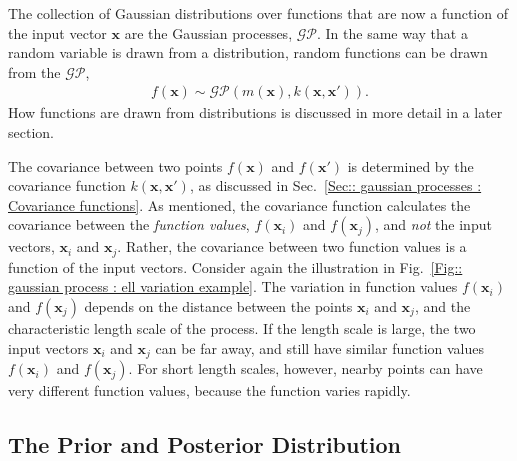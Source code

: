\documentclass[twoside,english]{uiofysmaster}
\begin{document}
{The collection of Gaussian distributions over functions that are now a function of the input vector $\textbf{x}$ are the Gaussian processes, $\mathcal{GP}$. In the same way that a random variable is drawn from a distribution, random functions can be drawn from the $\mathcal{GP}$,
\begin{align}
f(\textbf{x}) \sim \mathcal{GP}(m(\textbf{x}), k(\textbf{x}, \textbf{x}')).
\end{align}
How functions are drawn from distributions is discussed in more detail in a later section.

The covariance between two points $f(\textbf{x})$ and $f(\textbf{x}')$ is determined by the covariance function $k(\textbf{x}, \textbf{x}')$, as discussed in Sec.~\ref{Sec:: gaussian processes : Covariance functions}. As mentioned, the covariance function calculates the covariance between the \textit{function values}, $f(\textbf{x}_i)$ and $f(\textbf{x}_j)$, and \textit{not} the input vectors, $\textbf{x}_i$ and $\textbf{x}_j$. Rather, the covariance between two function values is a function of the input vectors. Consider again the illustration in Fig.~\ref{Fig:: gaussian process : ell variation example}. The variation in function values $f(\textbf{x}_i)$ and $f(\textbf{x}_j)$ depends on the distance between the points $\textbf{x}_i$ and $\textbf{x}_j$, and the characteristic length scale of the process. If the length scale is large, the two input vectors $\textbf{x}_i$ and $\textbf{x}_j$ can be far away, and still have similar function values $f(\textbf{x}_i)$ and $f(\textbf{x}_j)$. For short length scales, however, nearby points can have very different function values, because the function varies rapidly.

\subsection{The Prior and Posterior Distribution}



}
\end{document}

